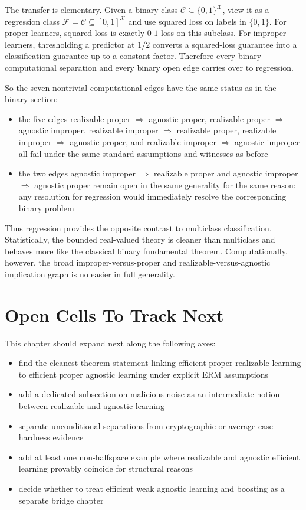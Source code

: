 The transfer is elementary. Given a binary class $\mathcal{C} \subseteq \{0,1\}^{\mathcal{X}}$, view it as a regression class $\mathcal{F} = \mathcal{C} \subseteq [0,1]^{\mathcal{X}}$ and use squared loss on labels in $\{0,1\}$. For proper learners, squared loss is exactly $0$-$1$ loss on this subclass. For improper learners, thresholding a predictor at $1/2$ converts a squared-loss guarantee into a classification guarantee up to a constant factor. Therefore every binary computational separation and every binary open edge carries over to regression.

So the seven nontrivial computational edges have the same status as in the binary section:

\begin{itemize}
\item the five edges realizable proper $\Rightarrow$ agnostic proper, realizable proper $\Rightarrow$ agnostic improper, realizable improper $\Rightarrow$ realizable proper, realizable improper $\Rightarrow$ agnostic proper, and realizable improper $\Rightarrow$ agnostic improper all fail under the same standard assumptions and witnesses as before \citep{valiant1984,kearns1994,pitt1988,haussler1990,tiegel2023}
\item the two edges agnostic improper $\Rightarrow$ realizable proper and agnostic improper $\Rightarrow$ agnostic proper remain open in the same generality for the same reason: any resolution for regression would immediately resolve the corresponding binary problem
\end{itemize}

Thus regression provides the opposite contrast to multiclass classification. Statistically, the bounded real-valued theory is cleaner than multiclass and behaves more like the classical binary fundamental theorem. Computationally, however, the broad improper-versus-proper and realizable-versus-agnostic implication graph is no easier in full generality.

\section{Open Cells To Track Next}

This chapter should expand next along the following axes:

\begin{itemize}
\item find the cleanest theorem statement linking efficient proper realizable learning to efficient proper agnostic learning under explicit ERM assumptions
\item add a dedicated subsection on malicious noise as an intermediate notion between realizable and agnostic learning
\item separate unconditional separations from cryptographic or average-case hardness evidence
\item add at least one non-halfspace example where realizable and agnostic efficient learning provably coincide for structural reasons
\item decide whether to treat efficient weak agnostic learning and boosting as a separate bridge chapter
\end{itemize}

